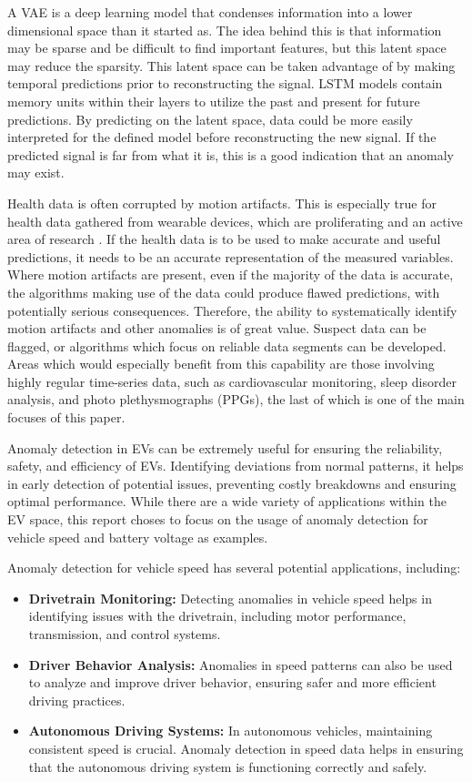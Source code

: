 \documentclass[conference]{IEEEtran}
\begin{document}
A VAE is a deep learning model that condenses information into a lower dimensional space than it started as. The idea behind this is that information may be sparse and be difficult to find important features, but this latent space may reduce the sparsity. This latent space can be taken advantage of by making temporal predictions prior to reconstructing the signal. LSTM models contain memory units within their layers to utilize the past and present for future predictions. By predicting on the latent space, data could be more easily interpreted for the defined model before reconstructing the new signal. If the predicted signal is far from what it is, this is a good indication that an anomaly may exist.

Health data is often corrupted by motion artifacts. This is especially true for health data gathered from wearable devices, which are proliferating and an active area of research \cite{conor_ref}. If the health data is to be used to make accurate and useful predictions, it needs to be an accurate representation of the measured variables. Where motion artifacts are present, even if the majority of the data is accurate, the algorithms making use of the data could produce flawed predictions, with potentially serious consequences. Therefore, the ability to systematically identify motion artifacts and other anomalies is of great value. Suspect data can be flagged, or algorithms which focus on reliable data segments can be developed. Areas which would especially benefit from this capability are those involving highly regular time-series data, such as cardiovascular monitoring, sleep disorder analysis, and photo plethysmographs (PPGs), the last of which is one of the main focuses of this paper.

Anomaly detection in EVs can be extremely useful for ensuring the reliability, safety, and efficiency of EVs. Identifying deviations from normal patterns, it helps in early detection of potential issues, preventing costly breakdowns and ensuring optimal performance. While there are a wide variety of applications within the EV space, this report choses to focus on the usage of anomaly detection for vehicle speed and battery voltage as examples.

Anomaly detection for vehicle speed has several potential applications, including:

\begin{itemize}
    \item \textbf{Drivetrain Monitoring:} Detecting anomalies in vehicle speed helps in identifying issues with the drivetrain, including motor performance, transmission, and control systems.
    \item \textbf{Driver Behavior Analysis:} Anomalies in speed patterns can also be used to analyze and improve driver behavior, ensuring safer and more efficient driving practices.
    \item \textbf{Autonomous Driving Systems:} In autonomous vehicles, maintaining consistent speed is crucial. Anomaly detection in speed data helps in ensuring that the autonomous driving system is functioning correctly and safely.
\end{itemize}
\end{document}

